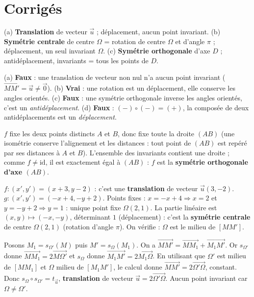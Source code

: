 \section{Corrigés}

(a) \textbf{Translation} de vecteur $\vec u$ ; déplacement, aucun point invariant.\;
(b) \textbf{Symétrie centrale} de centre $\Omega$ = rotation de centre $\Omega$ et d'angle $\pi$ ; déplacement, un seul invariant $\Omega$.\;
(c) \textbf{Symétrie orthogonale} d'axe $D$ ; antidéplacement, invariants = tous les points de $D$.

(a) \textbf{Faux} : une translation de vecteur non nul n'a aucun point invariant ($\overrightarrow{MM'}=\vec u\neq\vec0$).\;
(b) \textbf{Vrai} : une rotation est un déplacement, elle conserve les angles orientés.\;
(c) \textbf{Faux} : une symétrie orthogonale inverse les angles orientés, c'est un \emph{antidéplacement}.\;
(d) \textbf{Faux} : $(-)\circ(-)=(+)$, la composée de deux antidéplacements est un \emph{déplacement}.

$f$ fixe les deux points distincts $A$ et $B$, donc fixe toute la droite $(AB)$ (une isométrie conserve l'alignement et les distances : tout point de $(AB)$ est repéré par ses distances à $A$ et $B$). L'ensemble des invariants contient une droite ; comme $f\neq\mathrm{id}$, il est exactement égal à $(AB)$ : $f$ est la \textbf{symétrie orthogonale d'axe $(AB)$}.

$f:(x',y')=(x+3,y-2)$ : c'est une \textbf{translation} de vecteur $\vec u(3,-2)$.\;
$g:(x',y')=(-x+4,-y+2)$. Points fixes : $x=-x+4\Rightarrow x=2$ et $y=-y+2\Rightarrow y=1$ : unique point fixe $\Omega(2,1)$. La partie linéaire est $(x,y)\mapsto(-x,-y)$, déterminant $1$ (déplacement) : c'est la \textbf{symétrie centrale} de centre $\Omega(2,1)$ (rotation d'angle $\pi$). On vérifie : $\Omega$ est le milieu de $[M M']$.

Posons $M_1=s_{\Omega'}(M)$ puis $M'=s_\Omega(M_1)$. On a $\overrightarrow{MM'}=\overrightarrow{MM_1}+\overrightarrow{M_1M'}$. Or $s_{\Omega'}$ donne $\overrightarrow{M M_1}=2\overrightarrow{M\Omega'}$ et $s_\Omega$ donne $\overrightarrow{M_1 M'}=2\overrightarrow{M_1\Omega}$. En utilisant que $\Omega'$ est milieu de $[MM_1]$ et $\Omega$ milieu de $[M_1M']$, le calcul donne $\overrightarrow{MM'}=2\overrightarrow{\Omega'\Omega}$, constant. Donc $s_\Omega\circ s_{\Omega'}=t_{\vec u}$, \textbf{translation} de vecteur $\vec u=2\overrightarrow{\Omega'\Omega}$. Aucun point invariant car $\Omega\neq\Omega'$.

